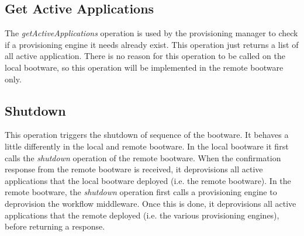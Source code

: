 \subsection{Get Active Applications}

The \textit{getActiveApplications} operation is used by the provisioning manager to check if a provisioning engine it needs already exist.
This operation just returns a list of all active application.
There is no reason for this operation to be called on the local bootware, so this operation will be implemented in the remote bootware only.

\subsection{Shutdown}

This operation triggers the shutdown of sequence of the bootware.
It behaves a little differently in the local and remote bootware.
In the local bootware it first calls the \textit{shutdown} operation of the remote bootware.
When the confirmation response from the remote bootware is received, it deprovisions all active applications that the local bootware deployed (i.e. the remote bootware).
In the remote bootware, the \textit{shutdown} operation first calls a provisioning engine to deprovision the workflow middleware.
Once this is done, it deprovisions all active applications that the remote deployed (i.e. the various provisioning engines), before returning a response.
